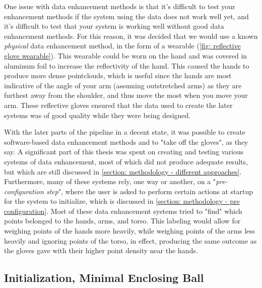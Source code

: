 One issue with data enhancement methods is that it's difficult to test your enhancement methods if the system using the data does not work well yet, and it's difficult to test that your system is working well without good data enhancement methods.
For this reason, it was decided that we would use a known \textit{physical} data enhancement method, in the form of a wearable (\cref{fig: reflective glove wearable}).
This wearable could be worn on the hand and was covered in aluminum foil to increase the reflectivity of the hand.
This caused the hands to produce more dense pointclouds, which is useful since the hands are most indicative of the angle of your arm (assuming outstretched arms) as they are furthest away from the shoulder, and thus move the most when you move your arm.
These reflective gloves ensured that the data used to create the later systems was of good quality while they were being designed.

With the later parts of the pipeline in a decent state, it was possible to create software-based data enhancement methods and to "take off the gloves", as they say.
A significant part of this thesis was spent on creating and testing various systems of data enhancement, most of which did not produce adequate results, but which are still discussed in \cref{section: methodology - different approaches}. 
Furthermore, many of these systems rely, one way or another, on a "\textit{pre-configuration step}", where the user is asked to perform certain actions at startup for the system to initialize, which is discussed in \cref{section: methodology - pre configuration}.
Most of these data enhancement systems tried to "find" which points belonged to the hands, arms, and torso.
This labeling would allow for weighing points of the hands more heavily, while weighing points of the arms less heavily and ignoring points of the torso, in effect, producing the same outcome as the gloves gave with their higher point density near the hands.

\subsection{Initialization, Minimal Enclosing Ball}
\label{sub-section: methodology - data enhancement - minimal enclosing ball}

